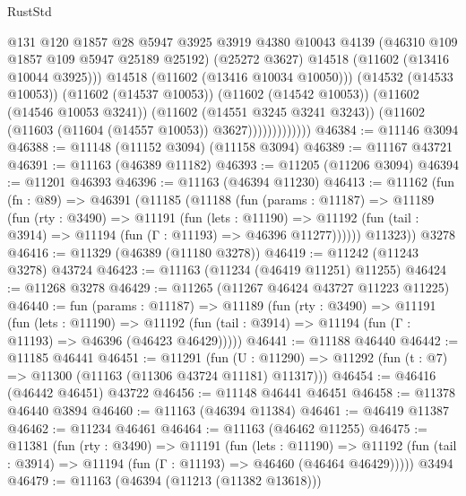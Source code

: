 \begin{lexlean}{RustStd}
\begin{coremodule}
                              @131
                              @120
                              @1857
                              @28
                              @5947
                              @3925
                              @3919
                              @4380
                              @10043
                              @4139
                              (@46310 @109 @1857 @109 @5947 @25189 @25192)
                              (@25272 @3627)
                              @14518
                              (@11602 (@13416 @10044 @3925)))
                            @14518
                            (@11602 (@13416 @10034 @10050)))
                          (@14532 (@14533 @10053))
                          (@11602 (@14537 @10053))
                          (@11602 (@14542 @10053))
                          (@11602 (@14546 @10053 @3241))
                          (@11602 (@14551 @3245 @3241 @3243))
                          (@11602 (@11603 (@11604 (@14557 @10053)) @3627)))))))))))))
@46384 := @11146 @3094
@46388 := @11148 (@11152 @3094) (@11158 @3094)
@46389 := @11167 @43721
@46391 := @11163 (@46389 @11182)
@46393 := @11205 (@11206 @3094)
@46394 := @11201 @46393
@46396 := @11163 (@46394 @11230)
@46413 := @11162
    (fun (fn : @89) =>
    @46391
      (@11185
        (@11188
          (fun (params : @11187) =>
          @11189
            (fun (rty : @3490) =>
            @11191
              (fun (lets : @11190) =>
              @11192 (fun (tail : @3914) => @11194 (fun (Γ : @11193) => @46396 @11277))))))
        @11323))
    @3278
@46416 := @11329 (@46389 (@11180 @3278))
@46419 := @11242 (@11243 @3278) @43724
@46423 := @11163 (@11234 (@46419 @11251) @11255)
@46424 := @11268 @3278
@46429 := @11265 (@11267 @46424 @43727 @11223 @11225)
@46440 := fun (params : @11187) =>
  @11189
    (fun (rty : @3490) =>
    @11191
      (fun (lets : @11190) =>
      @11192 (fun (tail : @3914) => @11194 (fun (Γ : @11193) => @46396 (@46423 @46429)))))
@46441 := @11188 @46440
@46442 := @11185 @46441
@46451 := @11291
    (fun (U : @11290) => @11292 (fun (t : @7) => @11300 (@11163 (@11306 @43724 @11181) @11317)))
@46454 := @46416 (@46442 @46451) @43722
@46456 := @11148 @46441 @46451
@46458 := @11378 @46440 @3894
@46460 := @11163 (@46394 @11384)
@46461 := @46419 @11387
@46462 := @11234 @46461
@46464 := @11163 (@46462 @11255)
@46475 := @11381
    (fun (rty : @3490) =>
    @11191
      (fun (lets : @11190) =>
      @11192 (fun (tail : @3914) => @11194 (fun (Γ : @11193) => @46460 (@46464 @46429)))))
    @3494
@46479 := @11163 (@46394 (@11213 (@11382 @13618)))

\end{coremodule}
\end{lexlean}
